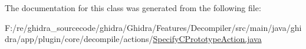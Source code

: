 The documentation for this class was generated from the following file\+:\begin{DoxyCompactItemize}
\item 
F\+:/re/ghidra\+\_\+sourcecode/ghidra/\+Ghidra/\+Features/\+Decompiler/src/main/java/ghidra/app/plugin/core/decompile/actions/\mbox{\hyperlink{_specify_c_prototype_action_8java}{Specify\+C\+Prototype\+Action.\+java}}\end{DoxyCompactItemize}
